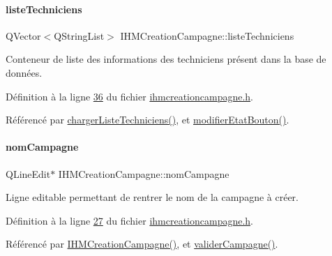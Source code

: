 \paragraph{\texorpdfstring{liste\+Techniciens}{listeTechniciens}}
{\footnotesize\ttfamily Q\+Vector$<$Q\+String\+List$>$ I\+H\+M\+Creation\+Campagne\+::liste\+Techniciens\hspace{0.3cm}{\ttfamily [private]}}



Conteneur de liste des informations des techniciens présent dans la base de données. 



Définition à la ligne \hyperlink{ihmcreationcampagne_8h_source_l00036}{36} du fichier \hyperlink{ihmcreationcampagne_8h_source}{ihmcreationcampagne.\+h}.



Référencé par \hyperlink{ihmcreationcampagne_8cpp_source_l00061}{charger\+Liste\+Techniciens()}, et \hyperlink{ihmcreationcampagne_8cpp_source_l00086}{modifier\+Etat\+Bouton()}.

\mbox{\label{class_i_h_m_creation_campagne_a6f07f2571a10f035c7b6a3ef1daefdab}} 
\paragraph{\texorpdfstring{nom\+Campagne}{nomCampagne}}
{\footnotesize\ttfamily Q\+Line\+Edit$\ast$ I\+H\+M\+Creation\+Campagne\+::nom\+Campagne\hspace{0.3cm}{\ttfamily [private]}}



Ligne editable permettant de rentrer le nom de la campagne à créer. 



Définition à la ligne \hyperlink{ihmcreationcampagne_8h_source_l00027}{27} du fichier \hyperlink{ihmcreationcampagne_8h_source}{ihmcreationcampagne.\+h}.



Référencé par \hyperlink{ihmcreationcampagne_8cpp_source_l00011}{I\+H\+M\+Creation\+Campagne()}, et \hyperlink{ihmcreationcampagne_8cpp_source_l00071}{valider\+Campagne()}.

\mbox{\label{class_i_h_m_creation_campagne_a5546fee9a51daceb1b719b105427dfe9}} 
